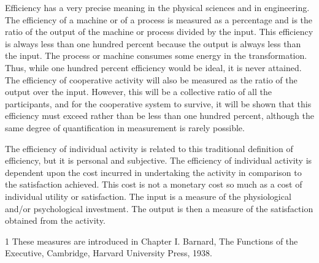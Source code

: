 Efficiency has a very precise meaning in the physical sciences and in engineering. The efficiency of a machine or of a process is measured as a percentage and is the ratio of the output of the machine or process divided by the input. This efficiency is always less than one hundred percent because the output is always less than the input. The process or machine consumes some energy in the transformation. Thus, while one hundred percent efficiency would be ideal, it is never attained. The efficiency of cooperative activity will also be measured as the ratio of the output over the input. However, this will be a collective ratio of all the participants, and for the cooperative system to survive, it will be shown that this efficiency must exceed rather than be less than one hundred percent, although the same degree of quantification in measurement is rarely possible.

The efficiency of individual activity is related to this traditional definition of efficiency, but it is personal and subjective. The efficiency of individual activity is dependent upon the cost incurred in undertaking the activity in comparison to the satisfaction achieved. This cost is not a monetary cost so much as a cost of individual utility or satisfaction. The input is a measure of the physiological and/or psychological investment. The output is then a measure of the satisfaction obtained from the activity.

    1 These measures are introduced in Chapter I. Barnard, The Functions of the Executive, Cambridge, Harvard University Press, 1938.